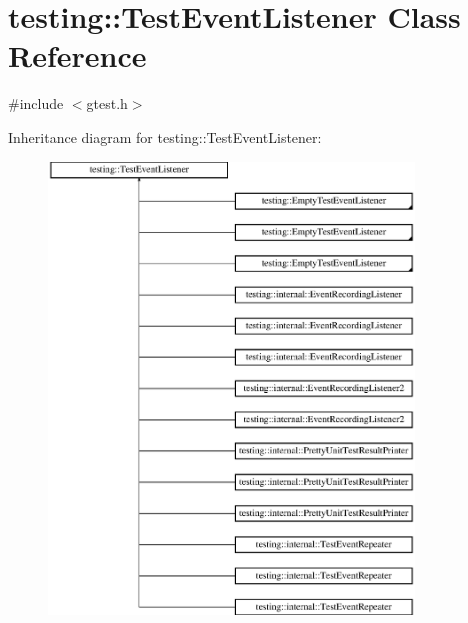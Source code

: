 \hypertarget{classtesting_1_1_test_event_listener}{}\section{testing\+::Test\+Event\+Listener Class Reference}
\label{classtesting_1_1_test_event_listener}


{\ttfamily \#include $<$gtest.\+h$>$}

Inheritance diagram for testing\+::Test\+Event\+Listener\+:\begin{figure}[H]
\begin{center}
\leavevmode
\includegraphics[height=12.000000cm]{d1/d46/classtesting_1_1_test_event_listener}
\end{center}
\end{figure}

